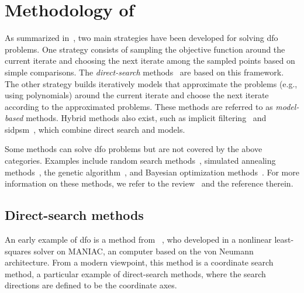 \section{Methodology of }

As summarized in~\cite{Conn_Scheinberg_Vicente_2009b}, two main strategies have been developed for solving \gls{dfo} problems.
One strategy consists of sampling the objective function around the current iterate and choosing the next iterate among the sampled points based on simple comparisons.
The \emph{direct-search} methods~\cite{Kolda_Lewis_Torczon_2003} are based on this framework.
The other strategy builds iteratively models that approximate the problems (e.g., using polynomials) around the current iterate and choose the next iterate according to the approximated problems.
These methods are referred to as \emph{model-based} methods.
Hybrid methods also exist, such as implicit filtering~\cite{Kelley_2011} and \gls{sidpsm}~\cite{Custodio_Rocha_Vicente_2009}, which combine direct search and models.

Some methods can solve \gls{dfo} problems but are not covered by the above categories.
Examples include random search methods~\cite{Zhigljavsky_1991}, simulated annealing methods~\cite{Kirkpatrick_Gelatt_Vecchi_1983}, the genetic algorithm~\cite{Jong_1975,Holland_1975}, and Bayesian optimization methods~\cite{Mockus_1975,Shahriari_Etal_2016}.
For more information on these methods, we refer to the review~\cite{Larson_Menickelly_Wild_2019} and the reference therein.

\subsection{Direct-search methods}

An early example of \gls{dfo} is a method from \citeauthor{Fermi_Metropolis_1952}~\cite{Fermi_Metropolis_1952}, who developed in \citeyear{Fermi_Metropolis_1952} a nonlinear least-squares solver on MANIAC, an computer based on the von Neumann architecture.
From a modern viewpoint, this method is a coordinate search method, a particular example of direct-search methods, where the search directions are defined to be the coordinate axes.

